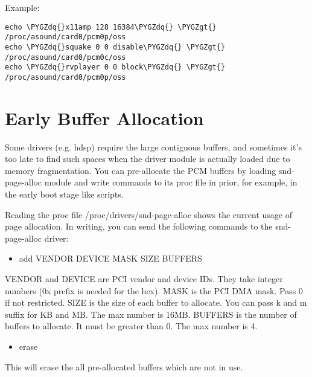 \documentclass[a4paper,8pt,english]{sphinxmanual}
\def\PYGZgt{\char`\>}
\def\PYGZdq{\char`\"}
\begin{document}
Example:

\begin{Verbatim}[commandchars=\\\{\}]
echo \PYGZdq{}x11amp 128 16384\PYGZdq{} \PYGZgt{} /proc/asound/card0/pcm0p/oss
echo \PYGZdq{}squake 0 0 disable\PYGZdq{} \PYGZgt{} /proc/asound/card0/pcm0c/oss
echo \PYGZdq{}rvplayer 0 0 block\PYGZdq{} \PYGZgt{} /proc/asound/card0/pcm0p/oss
\end{Verbatim}


\section{Early Buffer Allocation}
\label{sound/alsa-configuration:early-buffer-allocation}
Some drivers (e.g. hdsp) require the large contiguous buffers, and
sometimes it's too late to find such spaces when the driver module is
actually loaded due to memory fragmentation.  You can pre-allocate the
PCM buffers by loading snd-page-alloc module and write commands to its
proc file in prior, for example, in the early boot stage like
 scripts.

Reading the proc file /proc/drivers/snd-page-alloc shows the current
usage of page allocation.  In writing, you can send the following
commands to the snd-page-alloc driver:
\begin{itemize}
\item {} 
add VENDOR DEVICE MASK SIZE BUFFERS

\end{itemize}

VENDOR and DEVICE are PCI vendor and device IDs.  They take
integer numbers (0x prefix is needed for the hex).
MASK is the PCI DMA mask.  Pass 0 if not restricted.
SIZE is the size of each buffer to allocate.  You can pass
k and m suffix for KB and MB.  The max number is 16MB.
BUFFERS is the number of buffers to allocate.  It must be greater
than 0.  The max number is 4.
\begin{itemize}
\item {} 
erase

\end{itemize}

This will erase the all pre-allocated buffers which are not in
use.
\end{document}
